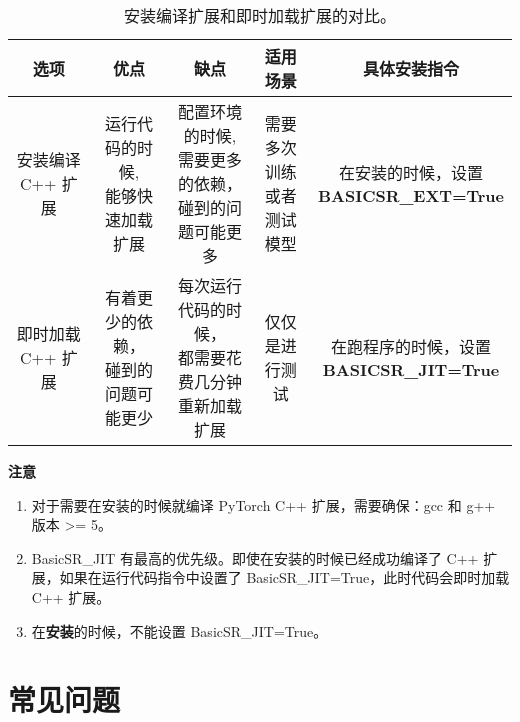\documentclass[../main.tex]{subfiles}
\begin{document}
\begin{table}[h]
\centering
\footnotesize
\begin{tabular}{|c|c|c|c|c|}
  \hline
  选项                     & 优点                  & 缺点                            & 适用场景         & 具体安装指令 \\
  \hline
  安装编译 C++ 扩展 & \makecell[c]{运行代码的时候, \\ 能够快速加载扩展} & \makecell*[c]{配置环境的时候, \\ 需要更多的依赖，\\碰到的问题可能更多} & \makecell[c]{需要多次训练 \\ 或者测试模型} & \makecell[c]{在安装的时候，设置 \\\textbf{BASICSR\_EXT=True}}\\
  \hline
  即时加载 C++ 扩展 & \makecell[c]{有着更少的依赖，\\碰到的问题可能更少} & \makecell[c]{每次运行代码的时候，\\都需要花费几分钟\\重新加载扩展} & 仅仅是进行测试 & \makecell[c]{在跑程序的时候，设置 \\\textbf{BASICSR\_JIT=True}} \\
  \hline
\end{tabular}
\caption{\label{tab:env}安装编译扩展和即时加载扩展的对比。}
\end{table}


\begin{note} %
    \textbf{注意}
	\begin{enumerate}
	    \item 对于需要在安装的时候就编译 PyTorch C++ 扩展，需要确保：gcc 和 g++ 版本 >= 5。
	    \item BasicSR\_JIT 有最高的优先级。即使在安装的时候已经成功编译了 C++ 扩展，如果在运行代码指令中设置了 BasicSR\_JIT=True，此时代码会即时加载 C++ 扩展。
	    \item 在\textbf{安装}的时候，不能设置 BasicSR\_JIT=True。
	\end{enumerate}
\end{note}




\section{常见问题}
\label{section:question}
\end{document}
